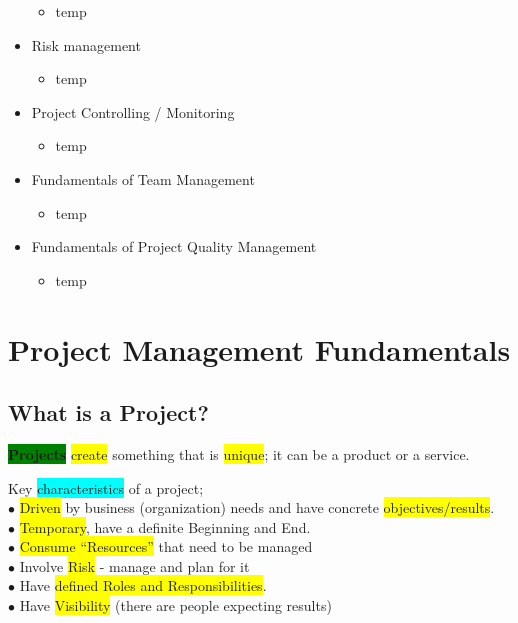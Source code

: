 \documentclass[]{project_plan}
\newcommand{\bulletPoint}{\hspace{-3.1pt}$\bullet$ \hspace{5pt}}
\begin{document}
\begin{itemize}
        \begin{itemize}
          \item temp
        \end{itemize}
  \item Risk management
        \begin{itemize}
          \item temp
        \end{itemize}
  \item Project Controlling / Monitoring
        \begin{itemize}
          \item temp
        \end{itemize}
  \item Fundamentals of Team Management
        \begin{itemize}
          \item temp
        \end{itemize}
  \item Fundamentals of Project Quality Management
        \begin{itemize}
          \item temp
        \end{itemize}
\end{itemize}

\newpage

\tableofcontents{}\newpage


\chapter{Project Management Fundamentals}

\section{What is a Project?}

\colorbox{green}{\textbf{Projects}} \colorbox{yellow}{create} something that is \colorbox{yellow}{unique}; it can be a product or a
service.

Key \colorbox{cyan}{characteristics} of a project;\\
\bulletPoint \colorbox{yellow}{Driven} by business (organization) needs and have concrete
\colorbox{yellow}{objectives/results}.\\
\bulletPoint \colorbox{yellow}{Temporary}, have a definite Beginning and End.\\
\bulletPoint \colorbox{yellow}{Consume “Resources”} that need to be managed\\
\bulletPoint Involve \colorbox{yellow}{Risk} - manage and plan for it\\
\bulletPoint Have \colorbox{yellow}{defined Roles and Responsibilities}.\\
\bulletPoint Have \colorbox{yellow}{Visibility} (there are people expecting results)
\end{document}
